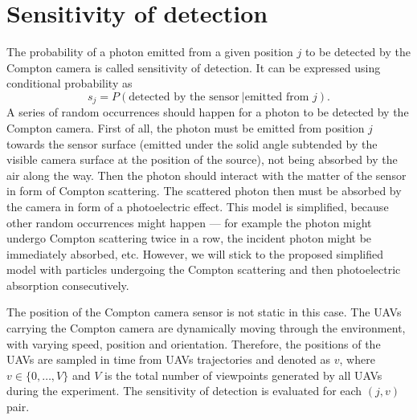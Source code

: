 
\section{Sensitivity of detection}%
\label{sec:sensitivity}
The probability of a photon emitted from a given position $j$ to be detected by the Compton camera is called sensitivity of detection.
It can be expressed using conditional probability as 
\begin{equation}
  s_{j} =  P(\textrm{detected by the sensor}\ | \textrm{emitted from } j).
\end{equation}
A series of random occurrences should happen for a photon to be detected by the Compton camera.
First of all, the photon must be emitted from position $j$ towards the sensor surface (emitted under the solid angle subtended by the visible camera surface at the position of the source), not being absorbed by the air along the way.
Then the photon should interact with the matter of the sensor in form of Compton scattering.
The scattered photon then must be absorbed by the camera in form of a photoelectric effect.
This model is simplified, because other random occurrences might happen --- for example the photon might undergo Compton scattering twice in a row, the incident photon might be immediately absorbed, etc.
However, we will stick to the proposed simplified model with particles undergoing the Compton scattering and then photoelectric absorption consecutively.

The position of the Compton camera sensor is not static in this case. 
The \ac{UAV}s carrying the Compton camera are dynamically moving through the environment, with varying speed, position and orientation.
Therefore, the positions of the \ac{UAV}s are sampled in time from \ac{UAV}s trajectories and denoted as $v$, where $v \in \{0, \dots , V\}$ and $V$ is the total number of viewpoints generated by all \ac{UAV}s during the experiment.
The sensitivity of detection is evaluated for each $(j,v)$ pair. %

